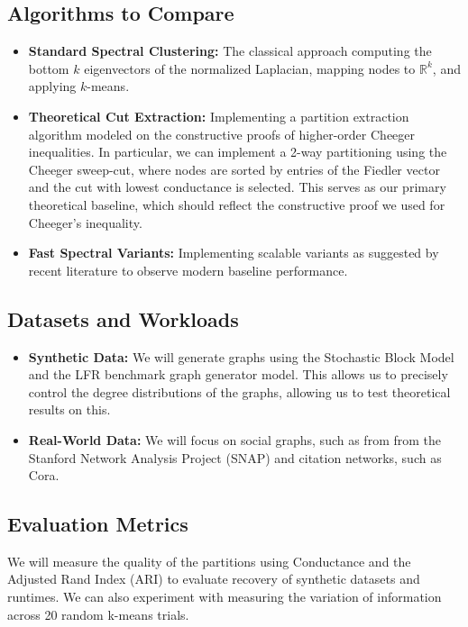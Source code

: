 \documentclass{article}
\theoremstyle{definition}
\theoremstyle{remark}
\begin{document}
\subsection{Algorithms to Compare}
\begin{itemize}
    \item \textbf{Standard Spectral Clustering:} The classical approach computing the bottom $k$ eigenvectors of the normalized Laplacian, mapping nodes to $\mathbb{R}^k$, and applying $k$-means.
    \item \textbf{Theoretical Cut Extraction:} Implementing a partition extraction algorithm modeled on the constructive proofs of higher-order Cheeger inequalities. In particular, we can implement a 2-way partitioning using the Cheeger sweep-cut, where nodes are sorted by entries of the Fiedler vector and the cut with lowest conductance is selected. This serves as our primary theoretical baseline, which should reflect the constructive proof we used for Cheeger's inequality.
    \item \textbf{Fast Spectral Variants:} Implementing scalable variants as suggested by recent literature to observe modern baseline performance.
\end{itemize}

\subsection{Datasets and Workloads}
\begin{itemize}
    \item \textbf{Synthetic Data:} We will generate graphs using the Stochastic Block Model and the LFR benchmark graph generator model. This allows us to precisely control the degree distributions of the graphs, allowing us to test theoretical results on this.
    
    \item \textbf{Real-World Data:} We will focus on social graphs, such as from from the Stanford Network Analysis Project (SNAP) and citation networks, such as Cora.
\end{itemize}

\subsection{Evaluation Metrics}
We will measure the quality of the partitions using Conductance and the Adjusted Rand Index (ARI) to evaluate recovery of synthetic datasets and runtimes. We can also experiment with measuring the variation of information across 20 random k-means trials.
\end{document}
